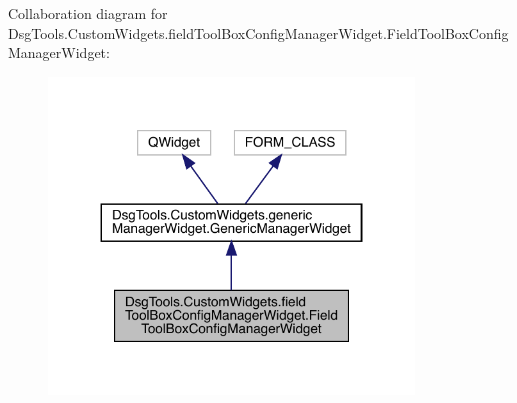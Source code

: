 Collaboration diagram for Dsg\+Tools.\+Custom\+Widgets.\+field\+Tool\+Box\+Config\+Manager\+Widget.\+Field\+Tool\+Box\+Config\+Manager\+Widget\+:
\nopagebreak
\begin{figure}[H]
\begin{center}
\leavevmode
\includegraphics[width=275pt]{class_dsg_tools_1_1_custom_widgets_1_1field_tool_box_config_manager_widget_1_1_field_tool_box_coac86e4db951fa0ed68b95d82290b0f50}
\end{center}
\end{figure}
